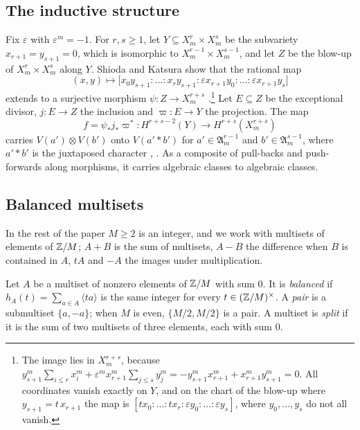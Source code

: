 \subsection{The inductive structure}
Fix $\varepsilon$ with $\varepsilon^{m}=-1$. For $r,s\ge1$, let
$Y\subseteq X^{r}_{m}\times X^{s}_{m}$ be the subvariety $x_{r+1}=y_{s+1}=0$,
which is isomorphic to $X^{r-1}_{m}\times X^{s-1}_{m}$, and let $Z$ be the
blow-up of $X^{r}_{m}\times X^{s}_{m}$ along $Y$. Shioda and Katsura show
that the rational map
\[
  (x,y)\mapsto\bigl[x_{0}y_{s+1}:\dots:x_{r}y_{s+1}:\varepsilon
  x_{r+1}y_{0}:\dots:\varepsilon x_{r+1}y_{s}\bigr]
\]
extends to a surjective morphism $\psi\colon Z\to X^{r+s}_{m}$
\cite[Lemma~1.2]{SK79}.\footnote{The image lies in $X^{r+s}_{m}$, because
$y_{s+1}^{m}\sum_{i\le r}x_{i}^{m}+\varepsilon^{m}x_{r+1}^{m}\sum_{j\le s}
y_{j}^{m}=-y_{s+1}^{m}x_{r+1}^{m}+x_{r+1}^{m}y_{s+1}^{m}=0$. All coordinates
vanish exactly on $Y$, and on the chart of the blow-up where
$y_{s+1}=t\,x_{r+1}$ the map is $[tx_{0}:\dots:tx_{r}:\varepsilon y_{0}:\dots:
\varepsilon y_{s}]$, where $y_{0},\dots,y_{s}$ do not all vanish.} Let
$E\subseteq Z$ be the exceptional divisor, $j\colon E\to Z$ the inclusion and
$\varpi\colon E\to Y$ the projection. The map
\[
  f=\psi_{*}j_{*}\varpi^{*}\colon H^{r+s-2}(Y)\to H^{r+s}(X^{r+s}_{m})
\]
carries $V(a')\otimes V(b')$ onto $V(a'*b')$ for $a'\in\mathfrak
A^{r-1}_{m}$ and $b'\in\mathfrak A^{s-1}_{m}$, where $a'*b'$ is the
juxtaposed character \cite[Theorem~II]{Shi79}, \cite[\S1]{Aok87}. As a
composite of pull-backs and push-forwards along morphisms, it carries
algebraic classes to algebraic classes.

\subsection{Balanced multisets}
In the rest of the paper $M\ge2$ is an integer, and we work with multisets
of elements of $\mathbb{Z}/M$; $A+B$ is the sum of multisets, $A-B$ the difference
when $B$ is contained in $A$, $tA$ and $-A$ the images under multiplication.

\begin{definition}\label{def:balanced}
Let $A$ be a multiset of nonzero elements of $\mathbb{Z}/M$ with sum $0$. It is
\emph{balanced} if $h_{A}(t)=\sum_{a\in A}\langle ta\rangle$ is the same
integer for every $t\in(\mathbb{Z}/M)^{\times}$. A \emph{pair} is a submultiset
$\{a,-a\}$; when $M$ is even, $\{M/2,M/2\}$ is a pair. A multiset is
\emph{split} if it is the sum of two multisets of three elements, each with
sum $0$.
\end{definition}

